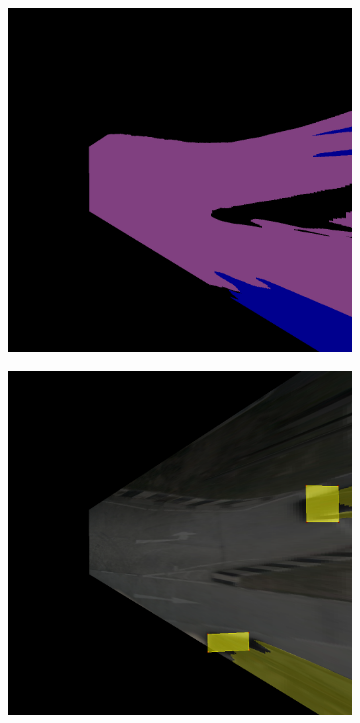 \begin{figure}[h!]
\begin{subfigure}[b]{0.22\textwidth}
        \includegraphics[width=\textwidth]{images/methodology/bev_occupancy_oclusion/bev_semantic_color_9.png}
        \caption{}
        \label{fig:bev_occupancy_occlusion_b}
    \end{subfigure}
    \hfill
    \begin{subfigure}[b]{0.22\textwidth}
        \includegraphics[width=\textwidth]{images/methodology/bev_occupancy_oclusion/bev_occ_9.png}

\end{subfigure}
\end{figure}
